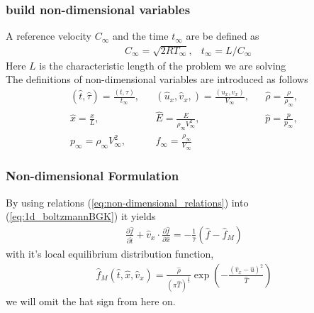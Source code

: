 \begin{frame} \frametitle{build non-dimensional variables}
	A reference velocity $C_\infty$ and the time $t_\infty$ are be defined as
	\begin{align}
		&C_{\infty} = \sqrt{2RT_{\infty}}, &t_{\infty} = L/C_{\infty}
	\end{align}
	Here $L$ is the characteristic length of the problem we are solving \\
	The definitions of non-dimensional variables are introduced as follows 
	\begin{subequations}\label{eq:non-dimensional_relations}
	\begin{align}
	&(\hat{t}, \hat{\tau})=\frac{(t,\tau)}{t_\infty},& &(\hat u_x,\hat v_x,)=\frac{(u_x,v_x)}{V_\infty},& &\hat{\rho}=\frac{\rho}{\rho_\infty},&\\
	&\hat{x}=\frac{x}{L},& &\hat{E}=\frac{E}{\rho_\infty V_\infty^2},& &\hat{p}=\frac{p}{p_\infty},&  \\ 
	&p_\infty = \rho_\infty V_\infty^2,& &f_\infty = \frac{\rho_\infty}{V_\infty}&
	\end{align}
	\end{subequations}
\end{frame}

\begin{frame} \frametitle{Non-dimensional Formulation}
	By using relations (\ref{eq:non-dimensional_relations}) into (\ref{eq:1d_boltzmannBGK}) it yields
	\begin{align}
	\frac{\partial \hat{f}}{\partial \hat{t}} + 
	\hat{v}_x\cdot\frac{\partial \hat{f}}{\partial \hat{x}} =
	- \frac{1}{\hat{\tau}} (\hat{f}-\hat{f}_M)
	\label{eq:1d_non_dimensional_boltzmannBGK}
	\end{align}
	with it's local equilibrium distribution function,
	\begin{align}
	\hat{f}_{M}(\hat{t},\hat{x},\hat{v}_x)=  \frac{\hat{\rho}}{(\pi \hat{T})^{\frac{1}{2}}} \exp\left(-{\frac{(\hat{v}_x-\hat{u})^2}{\hat{T}}} \right)
	\label{eq:1d_non_dimensional_distrib}
	\end{align}
	we will omit the hat sign from here on.
\end{frame}
